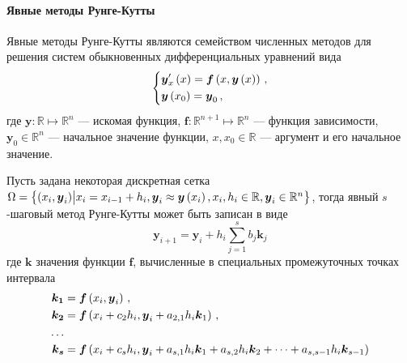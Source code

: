 \documentclass[../document.tex]{subfiles}
\begin{document}
            \paragraph{Явные методы Рунге-Кутты}
                \par Явные методы Рунге-Кутты являются семейством численных методов для решения систем обыкновенных дифференциальных уравнений вида
                \begin{equation}
                    \begin{dcases}
                        \boldsymbol{y}^{\prime}_x\left(x\right)=\boldsymbol{f}\left(x,\boldsymbol{y}\left(x\right)\right)\,,\\
                        \boldsymbol{y}\left(x_0\right)=\boldsymbol{y}_0\,,
                    \end{dcases}
                \end{equation}
                где $\boldsymbol{y}:\mathbb{R}\mapsto\mathbb{R}^n$ --- искомая функция, $\boldsymbol{f}:\mathbb{R}^{n+1}\mapsto\mathbb{R}^n$ --- функция зависимости, $\boldsymbol{y}_0\in\mathbb{R}^n$ --- начальное значение функции, $x,x_0\in\mathbb{R}$ --- аргумент и его начальное значение.
                \par Пусть задана некоторая дискретная сетка\\ $\Omega=\left\{\left(x_i,\boldsymbol{y}_i\right)\bigr|x_i=x_{i-1}+h_i,\boldsymbol{y}_i\approx\boldsymbol{y}\left(x_i\right),x_i,h_i\in\mathbb{R},\boldsymbol{y}_i\in\mathbb{R}^n\right\}$, тогда явный $s$-шаговый метод Рунге-Кутты может быть записан в виде
                \begin{equation}
                    \boldsymbol{y}_{i+1}=\boldsymbol{y}_i+h_i\sum\limits_{j=1}^{s}b_j\boldsymbol{k}_j
                \end{equation}
                где $\boldsymbol{k}$ значения функции $\boldsymbol{f}$, вычисленные в специальных промежуточных точках интервала
                \begin{equation}
                    \begin{aligned}
                        \boldsymbol{k_1}&=\boldsymbol{f}\left(x_i,\boldsymbol{y}_i\right)\,,\\
                        \boldsymbol{k_2}&=\boldsymbol{f}\left(x_i+c_2h_i,\boldsymbol{y}_i+a_{2,1}h_i\boldsymbol{k}_1\right)\,,\\
                        \dots&\\
                        \boldsymbol{k_s}&=\boldsymbol{f}\left(x_i+c_sh_i,\boldsymbol{y}_i+a_{s,1}h_i\boldsymbol{k}_1+a_{s,2}h_i\boldsymbol{k}_2+\dots+a_{s,s-1}h_i\boldsymbol{k}_{s-1}\right)
                    \end{aligned}
                \end{equation}
\end{document}
